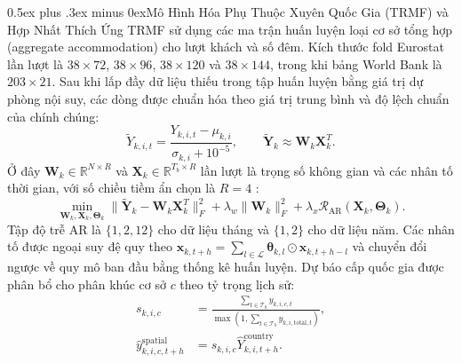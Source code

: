 \documentclass[10pt,journal,compsoc]{IEEEtran}
\makeatletter
\def\subsection{\@startsection{subsection}{2}{\z@}{-1.8ex plus -0.6ex minus -0.3ex}%
{0.5ex plus .3ex minus 0ex}{\normalfont\normalsize\rmfamily\bfseries}}
\makeatother
\begin{document}
\subsection{Mô Hình Hóa Phụ Thuộc Xuyên Quốc Gia (TRMF) và Hợp Nhất Thích Ứng}
\label{sec:trmf}
TRMF sử dụng các ma trận huấn luyện loại cơ sở tổng hợp (aggregate accommodation) cho lượt khách và số đêm. Kích thước fold Eurostat lần lượt là $38\times72$, $38\times96$, $38\times120$ và $38\times144$, trong khi bảng World Bank là $203\times21$. Sau khi lấp đầy dữ liệu thiếu trong tập huấn luyện bằng giá trị dự phòng nội suy, các dòng được chuẩn hóa theo giá trị trung bình và độ lệch chuẩn của chính chúng:
\begin{equation}
\widetilde{Y}_{k,i,t} = \frac{Y_{k,i,t}-\mu_{k,i}}{\sigma_{k,i}+10^{-5}}, \qquad \widetilde{\mathbf{Y}}_k \approx \mathbf{W}_k\mathbf{X}_k^T.
\label{eq:trmf_scaling}
\end{equation}
Ở đây $\mathbf{W}_k\in\mathbb{R}^{N\times R}$ và $\mathbf{X}_k\in\mathbb{R}^{T_b\times R}$ lần lượt là trọng số không gian và các nhân tố thời gian, với số chiều tiềm ẩn chọn là $R=4$ \cite{yu2016trmf}:
\begin{equation}
\min_{\mathbf{W}_k, \mathbf{X}_k, \boldsymbol{\Theta}_k} \|\widetilde{\mathbf{Y}}_k - \mathbf{W}_k \mathbf{X}_k^T\|_F^2 + \lambda_w \|\mathbf{W}_k\|_F^2 + \lambda_x \mathcal{R}_{\text{AR}}(\mathbf{X}_k, \boldsymbol{\Theta}_k).
\label{eq:trmf_objective}
\end{equation}
Tập độ trễ AR là $\{1,2,12\}$ cho dữ liệu tháng và $\{1,2\}$ cho dữ liệu năm. Các nhân tố được ngoại suy đệ quy theo $\mathbf{x}_{k,t+h}=\sum_{l\in\mathcal{L}}\boldsymbol{\theta}_{k,l}\odot\mathbf{x}_{k,t+h-l}$ và chuyển đổi ngược về quy mô ban đầu bằng thống kê huấn luyện. Dự báo cấp quốc gia được phân bổ cho phân khúc cơ sở $c$ theo tỷ trọng lịch sử:
\begin{equation}
\begin{aligned}
s_{k,i,c} &= \frac{\sum_{t\in\mathcal{T}_b}y_{k,i,c,t}}{\max\!\left(1,\sum_{t\in\mathcal{T}_b}y_{k,i,\mathrm{total},t}\right)}, \\
\hat{y}^{\mathrm{spatial}}_{k,i,c,t+h} &= s_{k,i,c}\hat{Y}^{\mathrm{country}}_{k,i,t+h}.
\end{aligned}
\label{eq:trmf_category_mapping}
\end{equation}
\end{document}
